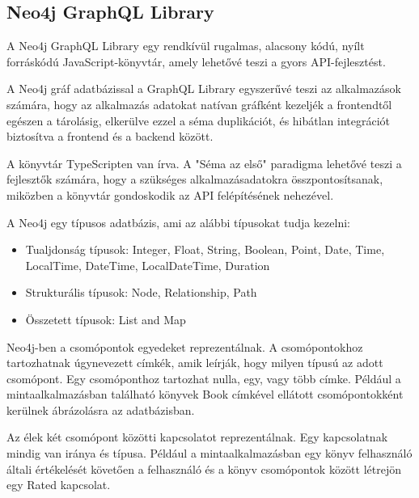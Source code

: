 \subsection{Neo4j GraphQL Library}
A Neo4j GraphQL Library egy rendkívül rugalmas, alacsony kódú, nyílt forráskódú JavaScript-könyvtár, amely lehetővé teszi a gyors API-fejlesztést.

A Neo4j gráf adatbázissal a GraphQL Library egyszerűvé teszi az alkalmazások számára, hogy az alkalmazás adatokat natívan gráfként kezeljék a frontendtől egészen a tárolásig, elkerülve ezzel a séma duplikációt, és hibátlan integrációt biztosítva a frontend és a backend között.

A könyvtár TypeScripten van írva. A "Séma az első" paradigma lehetővé teszi a fejlesztők számára, hogy a szükséges alkalmazásadatokra összpontosítsanak, miközben a könyvtár gondoskodik az API felépítésének nehezével. \cite{neo4j-graphql-library1} \cite{neo4j-graphql-library2}




A Neo4j egy típusos adatbázis, ami az alábbi típusokat tudja kezelni: \cite{neo4j-values}
\begin{itemize}
    \item Tualjdonság típusok: Integer, Float, String, Boolean, Point, Date, Time, LocalTime, DateTime, LocalDateTime, Duration
    \item Strukturális típusok: Node, Relationship, Path
    \item Összetett típusok: List and Map
\end{itemize}

Neo4j-ben a csomópontok egyedeket reprezentálnak. \cite{adatok-leirasa} A csomópontokhoz tartozhatnak úgynevezett címkék, amik leírják, hogy milyen típusú az adott csomópont. Egy csomóponthoz tartozhat nulla, egy, vagy több címke. Például a mintaalkalmazásban található könyvek Book címkével ellátott csomópontokként kerülnek ábrázolásra az adatbázisban.

Az élek két csomópont közötti kapcsolatot reprezentálnak. Egy kapcsolatnak mindig van iránya és típusa. Például a mintaalkalmazásban egy könyv felhasználó általi értékelését követően a felhasználó és a könyv csomópontok között létrejön egy Rated kapcsolat.

